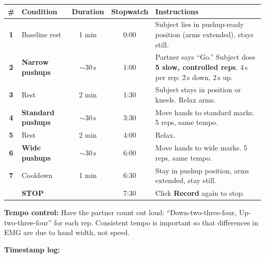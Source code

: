 \documentclass[11pt,letterpaper]{article}
\begin{document}
\begin{center}
\renewcommand{\arraystretch}{1.4}
\begin{tabular}{@{} >{\bfseries}c l c c p{5.5cm} @{}}
\toprule
\textbf{\#} & \textbf{Condition} & \textbf{Duration} & \textbf{Stopwatch} & \textbf{Instructions} \\
\midrule
\rowcolor{gray!10}
1 & Baseline rest & 1 min & 0:00 & Subject lies in pushup-ready position (arms extended), stays still. \\
\rowcolor{red!8}
2 & \textbf{Narrow pushups} & $\sim$30\,s & 1:00 & Partner says ``Go.'' Subject does \textbf{5 slow, controlled reps}. 4\,s per rep: 2\,s down, 2\,s up. \\
\rowcolor{gray!10}
3 & Rest & 2 min & 1:30 & Subject stays in position or kneels.  Relax arms. \\
\rowcolor{blue!8}
4 & \textbf{Standard pushups} & $\sim$30\,s & 3:30 & Move hands to standard marks.  5 reps, same tempo. \\
\rowcolor{gray!10}
5 & Rest & 2 min & 4:00 & Relax. \\
\rowcolor{yellow!15}
6 & \textbf{Wide pushups} & $\sim$30\,s & 6:00 & Move hands to wide marks.  5 reps, same tempo. \\
\rowcolor{gray!10}
7 & Cooldown & 1 min & 6:30 & Stay in pushup position, arms extended, stay still. \\
\midrule
& \textbf{STOP} & & 7:30 & Click \textbf{Record} again to stop. \\
\bottomrule
\end{tabular}
\end{center}

\begin{tipbox}
\textbf{Tempo control:} Have the partner count out loud:  ``Down-two-three-four, Up-two-three-four'' for each rep.  Consistent tempo is important so that differences in EMG are due to hand width, not speed.
\end{tipbox}

\vspace{0.3cm}
\textbf{Timestamp log:}
\end{document}

